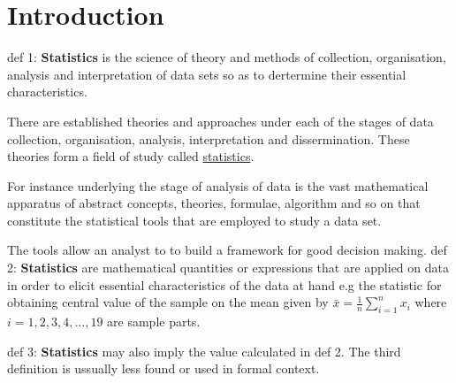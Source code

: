 \chapter{Introduction} %
\setlength{\parskip}{0.5em} %
def 1: \textbf{Statistics} is the science of theory and methods of collection, organisation, analysis and interpretation of data sets so as to dertermine their essential characteristics.

There are established theories and approaches under each of the stages of data collection, organisation, analysis, interpretation and dissermination. These theories form a field of study called \underline{statistics}.

For instance underlying the stage of analysis of data is the vast mathematical apparatus of abstract concepts, theories, formulae, algorithm and so on that constitute the statistical tools that are employed to study a data set.

The tools allow an analyst to to build a framework for good decision making.
\newline
def 2: \textbf{Statistics} are mathematical quantities or expressions that are applied on data in order to elicit essential characteristics of the data at hand e.g the statistic for obtaining central value of the sample on the mean given by $\bar{x} = \frac{1}{n}\sum_{i = 1}^{n} x_i$ where $i = 1,2,3,4, \dots,19$ are sample parts.

def 3: \textbf{Statistics} may also imply the value calculated in def 2.
The third definition is ussually less found or used in formal context.
\newpage
